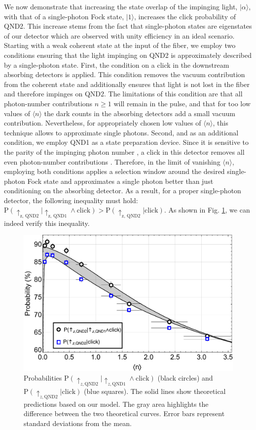 \documentclass[prl,amsmath,amssymb,bibnotes,aps,longbibliography,12pt]{revtex4-1}
\newcommand{\ket}[1]{|{#1}\rangle}
\newcommand{\braket}[1]{\langle{#1}\rangle}
\begin{document}
We now demonstrate that increasing the state overlap of the impinging light, $\ket{\alpha}$, with that of a single-photon Fock state, $\ket{1}$, increases the click probability of QND2. This increase stems from the fact that single-photon states are eigenstates of our detector which are observed with unity efficiency in an ideal scenario. Starting with a weak coherent state at the input of the fiber, we employ two conditions ensuring that the light impinging on QND2 is approximately described by a single-photon state. First, the condition on a click in the downstream absorbing detectors is applied. This condition removes the vacuum contribution from the coherent state and additionally ensures that light is not lost in the fiber and therefore impinges on QND2. The limitations of this condition are that all photon-number contributions $n\ge1$ will remain in the pulse, and that for too low values of $\braket{n}$ the dark counts in the absorbing detectors add a small vacuum contribution. Nevertheless, for appropriately chosen low values of $\braket{n}$, this technique allows to approximate single photons. Second, and as an additional condition, we employ QND1 as a state preparation device. Since it is sensitive to the parity of the impinging photon number \cite{wang2005, hacker2019}, a click in this detector removes all even photon-number contributions \cite{daiss2019}. Therefore, in the limit of vanishing $\braket{n}$, employing both conditions applies a selection window around the desired single-photon Fock state and approximates a single photon better than just conditioning on the absorbing detector. As a result, for a proper single-photon detector, the following inequality must hold:  $\text{P}(\uparrow_{\text{z, QND2}}\vert\uparrow_{\text{z, QND1}}\land\text{click})>\text{P}(\uparrow_{\text{z, QND2}}\vert\text{click})$. 
As shown in Fig. \ref{fig:distillation}, we can indeed verify this inequality.
\begin{figure}[t]
\centering
\includegraphics[width=\columnwidth]{Fig4.pdf}
\caption{\label{fig:distillation}
Probabilities $\text{P}(\uparrow_{z, \text{QND}2}\vert \uparrow_{z,\text{QND}1}\land  \text{click})$ (black circles) and $\text{P}(\uparrow_{z, \text{QND}2}\vert \text{click})$ (blue squares).  The solid lines show theoretical predictions based on our model. The gray area highlights the difference between the two theoretical curves. Error bars represent standard deviations from the mean.
}
\end{figure}
\end{document}
